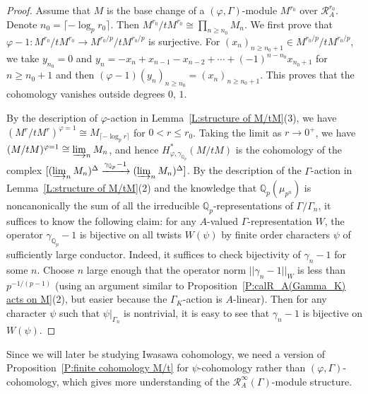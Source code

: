 \documentclass[12pt]{article}
\theoremstyle{definition}
\numberwithin{equation}{theorem}
\newcommand{\calR}{\mathcal{R}}
\newcommand{\QQ}{\mathbb{Q}}
\def\Qp{\QQ_p}
\begin{document}
\begin{proof}
Assume that $M$ is the base change of a $(\varphi, \Gamma)$-module
$M^{r_0}$ over $\calR_A^{r_0}$.  Denote $n_0 = \lceil -\log_p r_0
\rceil$. Then $M^{r_0} / tM^{r_0} \cong \prod_{n \geq n_0}M_n$.  We
first prove that $\varphi-1: M^{r_0}/tM^{r_0} \to
M^{r_0/p}/tM^{r_0/p}$ is surjective.  For $(x_n)_{n \geq n_0+1} \in
M^{r_0/p}/tM^{r_0/p}$, we take $y_{n_0} = 0$ and $y_n = -x_n + x_{n-1}
-x_{n-2}+\cdots +(-1)^{n-n_0} x_{n_0+1}$ for $n \geq n_0+1$ and then
$(\varphi-1)(y_n)_{n \geq n_0} = (x_n)_{n \geq n_0+1}$.  This proves
that the cohomology vanishes outside degrees $0$, $1$.

By the description of $\varphi$-action in Lemma~\ref{L:structure of
  M/tM}(3), we have $(M^r/tM^r)^{\varphi=1} \cong
M_{\lceil-\log_pr\rceil}$ for $0<r\leq r_0$.  Taking the limit as $r
\to 0^+$, we have $(M/tM)^{\varphi=1} \cong \varinjlim_n M_n$, and
hence $H^*_{\varphi, \gamma_{\Qp}}(M/tM)$ is the cohomology of the
complex $[(\varinjlim_n M_n)^\Delta \xrightarrow{\gamma_{\Qp}-1}
  (\varinjlim_n M_n)^\Delta]$. By the description of the
$\Gamma$-action in Lemma~\ref{L:structure of M/tM}(2) and the
knowledge that $\Qp(\mu_{p^n})$ is noncanonically the sum of all the
irreducible $\Qp$-representations of $\Gamma/\Gamma_n$, it suffices to
know the following claim: for any $A$-valued $\Gamma$-representation
$W$, the operator $\gamma_{\Qp}-1$ is bijective on all twists
$W(\psi)$ by finite order characters $\psi$ of sufficiently large
conductor.  Indeed, it suffices to check bijectivity of $\gamma_n-1$
for some $n$. Choose $n$ large enough that the operator norm
$||\gamma_n-1||_W$ is less than $p^{-1/(p-1)}$ (using an argument
similar to Proposition~\ref{P:calR_A(Gamma_K) acts on M}(2), but
easier because the $\Gamma_K$-action is $A$-linear).  Then for any
character $\psi$ such that $\psi|_{\Gamma_n}$ is nontrivial, it is
easy to see that $\gamma_n-1$ is bijective on $W(\psi)$.
\end{proof}

Since we will later be studying Iwasawa cohomology, we need a version of Proposition~\ref{P:finite cohomology M/t} for $\psi$-cohomology rather than $(\varphi,\Gamma)$-cohomology, which gives more understanding of the $\calR_A^\infty(\Gamma)$-module structure.
\end{document}
